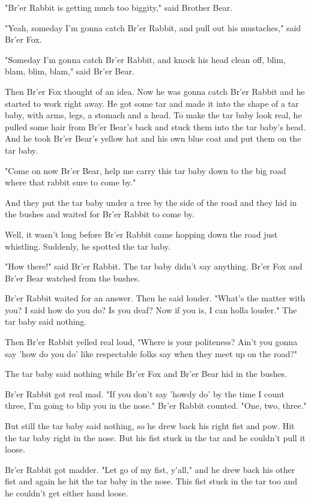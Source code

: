 "Br'er Rabbit is getting much too biggity," said Brother Bear.

"Yeah, someday I'm gonna catch Br'er Rabbit, and pull out his mustaches," said Br'er Fox.

"Someday I'm gonna catch Br'er Rabbit, and knock his head clean off, blim, blam, blim, blam," said Br'er Bear.

Then Br'er Fox thought of an idea. Now he was gonna catch Br'er Rabbit and he started to work right away. He got some tar and made it into the shape of a tar baby, with arms, legs, a stomach and a head. To make the tar baby look real, he pulled some hair from Br'er Bear's back and stuck them into the tar baby's head. And he took Br'er Bear's yellow hat and his own blue coat and put them on the tar baby.

"Come on now Br'er Bear, help me carry this tar baby down to the big road where that rabbit sure to come by."

And they put the tar baby under a tree by the side of the road and they hid in the bushes and waited for Br'er Rabbit to come by.

Well, it wasn't long before Br'er Rabbit came hopping down the road just whistling. Suddenly, he spotted the tar baby.

"How there!" said Br'er Rabbit. The tar baby didn't say anything. Br'er Fox and Br'er Bear watched from the bushes.

Br'er Rabbit waited for an answer. Then he said louder. "What's the matter with you? I said how do you do? Is you deaf? Now if you is, I can holla louder." The tar baby said nothing.

Then Br'er Rabbit yelled real loud, "Where is your politeness? Ain't you gonna say 'how do you do' like respectable folks say when they meet up on the road?"

The tar baby said nothing while Br'er Fox and Br'er Bear hid in the bushes.

Br'er Rabbit got real mad. "If you don't say 'howdy do' by the time I count three, I'm going to blip you in the nose." Br'er Rabbit counted. "One, two, three."

But still the tar baby said nothing, so he drew back his right fist and pow. Hit the tar baby right in the nose. But his fist stuck in the tar and he couldn't pull it loose.

Br'er Rabbit got madder. "Let go of my fist, y'all," and he drew back his other fist and again he hit the tar baby in the nose. This fist stuck in the tar too and he couldn't get either hand loose.


